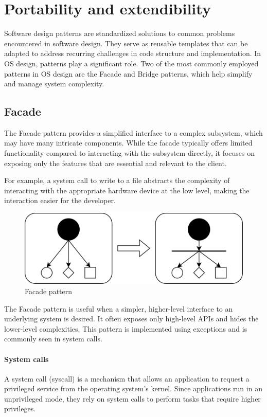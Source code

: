 \section{Portability and extendibility}

Software design patterns are standardized solutions to common problems encountered in software design. 
They serve as reusable templates that can be adapted to address recurring challenges in code structure and implementation. 
In OS design, patterns play a significant role. Two of the most commonly employed patterns in OS design are the Facade and Bridge patterns, which help simplify and manage system complexity.

\subsection{Facade}
The Facade pattern provides a simplified interface to a complex subsystem, which may have many intricate components. 
While the facade typically offers limited functionality compared to interacting with the subsystem directly, it focuses on exposing only the features that are essential and relevant to the client.

For example, a system call to write to a file abstracts the complexity of interacting with the appropriate hardware device at the low level, making the interaction easier for the developer.
\begin{figure}[H]
    \centering
    \includegraphics[width=0.75\linewidth]{images/facade.png}
    \caption{Facade pattern}
\end{figure}
The Facade pattern is useful when a simpler, higher-level interface to an underlying system is desired. 
It often exposes only high-level APIs and hides the lower-level complexities. This pattern is implemented using exceptions and is commonly seen in system calls.

\paragraph*{System calls}
A system call (syscall) is a mechanism that allows an application to request a privileged service from the operating system's kernel. 
Since applications run in an unprivileged mode, they rely on system calls to perform tasks that require higher privileges.

